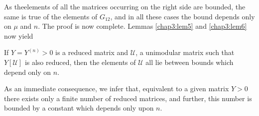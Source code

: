 As the\pageoriginale elements of all the  matrices occurring on the
right side are 
bounded, the same is true of the  elements of $ G_{12} $, and in all
these cases the bound depends only on $ \mu $ and $n$. The proof is
now complete. Lemmas \ref{chap3:lem5} and \ref{chap3:lem6} now yield 

\begin{lem}\label{chap3:lem7}%
 If $Y = Y^{(n)} > 0 $ is  a reduced matrix  and
   $\mathcal{U}$, a unimodular matrix such that $Y[\mathcal{U}]
   $ is also reduced, then the elements of $ \mathcal{U} $ all lie
   between  bounds which depend only on $n$. 
\end{lem}
 
As an immediate consequence, we infer that, equivalent to a given
matrix $Y> 0 $ there exists only a finite number of reduced
matrices, and further, this number is bounded by a constant which
depends only upon $n$.  

